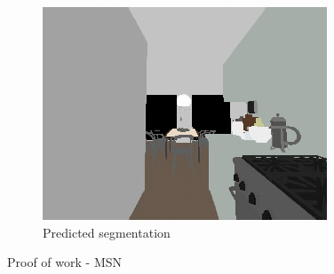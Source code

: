 \begin{figure}[H]
\begin{subfigure}{0.32\linewidth}
    \includegraphics[width=\linewidth]{praca/images/AI45_007_Cam09.predicted_segmentation.png}
    \caption{Predicted segmentation}
  \end{subfigure}
  \caption[Proof of work - MSN]{Proof of work - MSN}
  \label{fig:proof-of-work-msn}
\end{figure}

